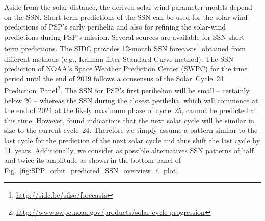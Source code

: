 \documentclass[]{aa}
\begin{document}
        Aside from the solar distance, the derived solar-wind parameter models depend on the SSN. Short-term predictions of the SSN can be used for the solar-wind predictions of PSP's early perihelia and also for refining the solar-wind predictions during PSP's mission. Several sources are available for SSN short-term predictions. The SIDC provides 12-month SSN forecasts\footnote{\url{http://sidc.be/silso/forecasts}} obtained from different methods (e.g., Kalman filter Standard Curve method). The SSN prediction of NOAA's Space Weather Prediction Center (SWPC) for the time period until the end of 2019 follows  a consensus of the Solar~Cycle~24 Prediction~Panel\footnote{\url{http://www.swpc.noaa.gov/products/solar-cycle-progression}}.
        The SSN for PSP's first perihelion will be small -- certainly below 20 -- whereas the SSN during the closest perihelia, which will commence at the end of 2024 at the likely maximum phase of cycle~25, cannot be predicted at this time. However, \citet{Hathaway2016} found indications that the next solar cycle will be similar in size to the current cycle~24. Therefore we simply assume a pattern similar to the last cycle for the prediction of the next solar cycle and thus shift the last cycle by 11~years. Additionally, we consider as possible alternatives SSN patterns of half and twice its amplitude as shown in the bottom panel of Fig.~\ref{fig:SPP_orbit_predicted_SSN_overview_f_plot}.
\end{document}
